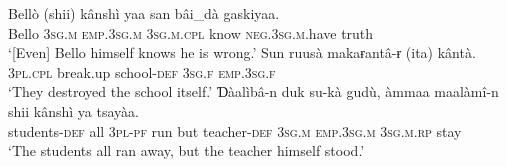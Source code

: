 \documentclass[output=paper]{langscibook}
\begin{document}
\ea%
    \label{ex:Abdoulaye:30}
    \ea \label{ex:Abdoulaye:30a}
    \gll Bellò  (shii)  kânshì  yaa  san  bâi\_dà  gaskiyaa.\\
    Bello  \textsc{3sg.m}  \textsc{emp.3sg.m}  \textsc{3sg.m.cpl}  know  \textsc{neg.3sg.m}.have  truth\\
    \glt `[Even] Bello himself knows he is wrong.’
    \ex  \label{ex:Abdoulaye:30b}
    \gll  Sun  ruusà  makaɍantâ-ɍ  (ita)  kântà.\\
    \textsc{3pl.cpl}  break.up  school-\textsc{def}  \textsc{3sg.f}  \textsc{emp.3sg.f}\\
    \glt `They destroyed the school itself.’
    \ex \label{ex:Abdoulaye:30c}
    \gll Ɗàalìbâ-n  duk  su-kà  gudù,  àmmaa  maalàmî-n  shii  kânshì  ya  tsayàa.\\
    students-\textsc{def}  all  \textsc{3pl-pf}  run  but  teacher-\textsc{def}  \textsc{3sg.m}  \textsc{emp.3sg.m} \textsc{3sg.m.rp}  stay\\
    \glt `The students all ran away, but the teacher himself stood.’
    \z
\z
 
        
\end{document}
